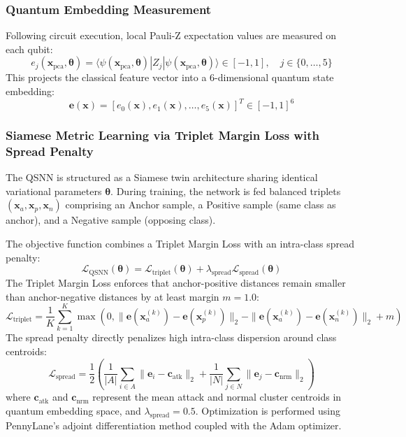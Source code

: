 \documentclass[preprint,12pt]{elsarticle}
\begin{document}
\subsubsection{Quantum Embedding Measurement}
Following circuit execution, local Pauli-Z expectation values are measured on each qubit:
\begin{equation}
    e_j(\mathbf{x}_{\text{pca}}, \boldsymbol{\theta}) = \langle \psi(\mathbf{x}_{\text{pca}}, \boldsymbol{\theta}) | Z_j | \psi(\mathbf{x}_{\text{pca}}, \boldsymbol{\theta}) \rangle \in [-1, 1], \quad j \in \{0, \dots, 5\}
\end{equation}
This projects the classical feature vector into a 6-dimensional quantum state embedding:
\begin{equation}
    \mathbf{e}(\mathbf{x}) = [e_0(\mathbf{x}), e_1(\mathbf{x}), \dots, e_5(\mathbf{x})]^T \in [-1, 1]^6
\end{equation}

\subsubsection{Siamese Metric Learning via Triplet Margin Loss with Spread Penalty}
The QSNN is structured as a Siamese twin architecture sharing identical variational parameters $\boldsymbol{\theta}$. During training, the network is fed balanced triplets $(\mathbf{x}_a, \mathbf{x}_p, \mathbf{x}_n)$ comprising an Anchor sample, a Positive sample (same class as anchor), and a Negative sample (opposing class).

The objective function combines a Triplet Margin Loss with an intra-class spread penalty:
\begin{equation}
    \mathcal{L}_{\text{QSNN}}(\boldsymbol{\theta}) = \mathcal{L}_{\text{triplet}}(\boldsymbol{\theta}) + \lambda_{\text{spread}} \mathcal{L}_{\text{spread}}(\boldsymbol{\theta})
\end{equation}
The Triplet Margin Loss enforces that anchor-positive distances remain smaller than anchor-negative distances by at least margin $m = 1.0$:
\begin{equation}
    \mathcal{L}_{\text{triplet}} = \frac{1}{K} \sum_{k=1}^K \max\left(0, \|\mathbf{e}(\mathbf{x}_a^{(k)}) - \mathbf{e}(\mathbf{x}_p^{(k)})\|_2 - \|\mathbf{e}(\mathbf{x}_a^{(k)}) - \mathbf{e}(\mathbf{x}_n^{(k)})\|_2 + m\right)
\end{equation}
The spread penalty directly penalizes high intra-class dispersion around class centroids:
\begin{equation}
    \mathcal{L}_{\text{spread}} = \frac{1}{2}\left( \frac{1}{|A|} \sum_{i \in A} \|\mathbf{e}_i - \mathbf{c}_{\text{atk}}\|_2 + \frac{1}{|N|} \sum_{j \in N} \|\mathbf{e}_j - \mathbf{c}_{\text{nrm}}\|_2 \right)
\end{equation}
where $\mathbf{c}_{\text{atk}}$ and $\mathbf{c}_{\text{nrm}}$ represent the mean attack and normal cluster centroids in quantum embedding space, and $\lambda_{\text{spread}} = 0.5$. Optimization is performed using PennyLane's adjoint differentiation method coupled with the Adam optimizer.
\end{document}
